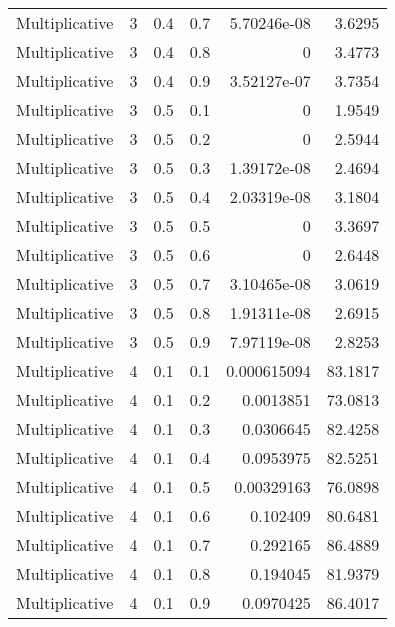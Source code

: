\documentclass{article}
\begin{document}
\begin{longtable}[H]{lrrrrr}
 Multiplicative &       3 &   0.4 &            0.7 &   5.70246e-08 &          3.6295 \\
 Multiplicative &       3 &   0.4 &            0.8 &   0           &          3.4773 \\
 Multiplicative &       3 &   0.4 &            0.9 &   3.52127e-07 &          3.7354 \\
 Multiplicative &       3 &   0.5 &            0.1 &   0           &          1.9549 \\
 Multiplicative &       3 &   0.5 &            0.2 &   0           &          2.5944 \\
 Multiplicative &       3 &   0.5 &            0.3 &   1.39172e-08 &          2.4694 \\
 Multiplicative &       3 &   0.5 &            0.4 &   2.03319e-08 &          3.1804 \\
 Multiplicative &       3 &   0.5 &            0.5 &   0           &          3.3697 \\
 Multiplicative &       3 &   0.5 &            0.6 &   0           &          2.6448 \\
 Multiplicative &       3 &   0.5 &            0.7 &   3.10465e-08 &          3.0619 \\
 Multiplicative &       3 &   0.5 &            0.8 &   1.91311e-08 &          2.6915 \\
 Multiplicative &       3 &   0.5 &            0.9 &   7.97119e-08 &          2.8253 \\
 Multiplicative &       4 &   0.1 &            0.1 &   0.000615094 &         83.1817 \\
 Multiplicative &       4 &   0.1 &            0.2 &   0.0013851   &         73.0813 \\
 Multiplicative &       4 &   0.1 &            0.3 &   0.0306645   &         82.4258 \\
 Multiplicative &       4 &   0.1 &            0.4 &   0.0953975   &         82.5251 \\
 Multiplicative &       4 &   0.1 &            0.5 &   0.00329163  &         76.0898 \\
 Multiplicative &       4 &   0.1 &            0.6 &   0.102409    &         80.6481 \\
 Multiplicative &       4 &   0.1 &            0.7 &   0.292165    &         86.4889 \\
 Multiplicative &       4 &   0.1 &            0.8 &   0.194045    &         81.9379 \\
 Multiplicative &       4 &   0.1 &            0.9 &   0.0970425   &         86.4017 \\

\end{longtable}
\end{document}

